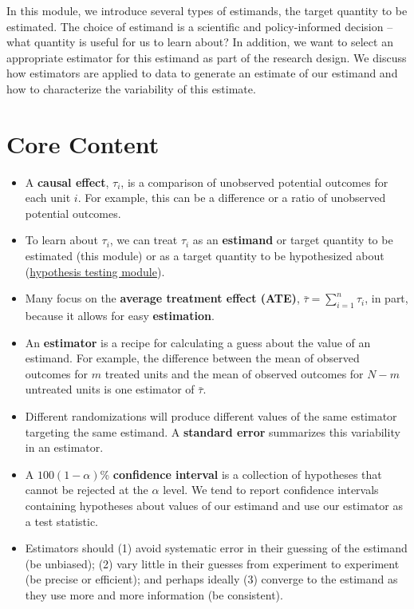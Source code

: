 \documentclass[12pt,]{book}
\begin{document}
In this module, we introduce several types of estimands, the target quantity to be estimated. The choice of estimand is a scientific and policy-informed decision -- what quantity is useful for us to learn about? In addition, we want to select an appropriate estimator for this estimand as part of the research design. We discuss how estimators are applied to data to generate an estimate of our estimand and how to characterize the variability of this estimate.

\hypertarget{core-content-4}{%
\section{Core Content}\label{core-content-4}}

\begin{itemize}
\item
  A \textbf{causal effect}, \(\tau_i\), is a comparison of unobserved potential outcomes for each unit \(i\). For example, this can be a difference or a ratio of unobserved potential outcomes.
\item
  To learn about \(\tau_{i}\), we can treat \(\tau_{i}\) as an \textbf{estimand} or target quantity to be estimated (this module) or as a target quantity to be hypothesized about (\href{hypothesis-testing.html}{hypothesis testing module}).
\item
  Many focus on the \textbf{average treatment effect (ATE)}, \(\bar{\tau}=\sum_{i=1}^n  \tau_{i}\), in part, because it allows for easy \textbf{estimation}.
\item
  An \textbf{estimator} is a recipe for calculating a guess about the value of an estimand. For example, the difference between the mean of observed outcomes for \(m\) treated units and the mean of observed outcomes for \(N-m\) untreated units is one estimator of \(\bar{\tau}\).
\item
  Different randomizations will produce different values of the same estimator targeting the same estimand. A \textbf{standard error} summarizes this variability in an estimator.
\item
  A \(100(1-\alpha)\)\% \textbf{confidence interval} is a collection of hypotheses that cannot be rejected at the \(\alpha\) level. We tend to report confidence intervals containing hypotheses about values of our estimand and use our estimator as a test statistic.
\item
  Estimators should (1) avoid systematic error in their guessing of the estimand (be unbiased); (2) vary little in their guesses from experiment to experiment (be precise or efficient); and perhaps ideally (3) converge to the estimand as they use more and more information (be consistent).

\end{itemize}
\end{document}
